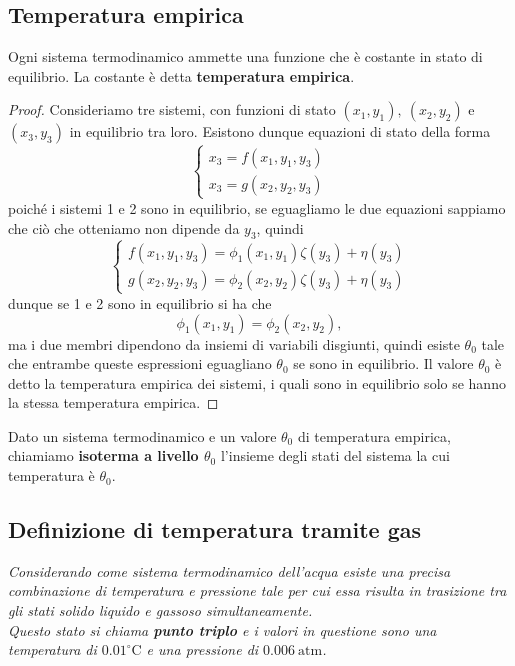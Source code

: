 \subsection{Temperatura empirica}

\begin{proposition}\label{TemperaturaEmpirica}
Ogni sistema termodinamico ammette una funzione che \`e costante in stato di equilibrio. La costante \`e detta \textbf{temperatura empirica}.
\end{proposition}
\begin{proof}
Consideriamo tre sistemi, con funzioni di stato $(x_1, y_1),\ (x_2,y_2)$ e $(x_3,y_3)$ in equilibrio tra loro. Esistono dunque equazioni di stato della forma
\[\begin{cases}
x_3=f(x_1,y_1,y_3)\\
x_3=g(x_2,y_2,y_3)
\end{cases}\]
poich\'e i sistemi 1 e 2 sono in equilibrio, se eguagliamo le due equazioni sappiamo che ci\`o che otteniamo non dipende da $y_3$, quindi
\[\begin{cases}
f(x_1,y_1,y_3)=\phi_1(x_1,y_1)\zeta(y_3)+\eta(y_3)\\
g(x_2,y_2,y_3)=\phi_2(x_2,y_2)\zeta(y_3)+\eta(y_3)
\end{cases}\]
dunque se 1 e 2 sono in equilibrio si ha che 
\[\phi_1(x_1,y_1)=\phi_2(x_2,y_2),\]
ma i due membri dipendono da insiemi di variabili disgiunti, quindi esiste $\theta_0$ tale che entrambe queste espressioni eguagliano $\theta_0$ se sono in equilibrio. Il valore $\theta_0$ \`e detto la temperatura empirica dei sistemi, i quali sono in equilibrio solo se hanno la stessa temperatura empirica.
\end{proof}

\begin{definition}[Isoterme]
Dato un sistema termodinamico e un valore $\theta_0$ di temperatura empirica, chiamiamo \textbf{isoterma a livello $\theta_0$} l'insieme degli stati del sistema la cui temperatura \`e $\theta_0$.
\end{definition}


\subsection{Definizione di temperatura tramite gas}
\begin{fact}
\emph{Considerando come sistema termodinamico dell'acqua esiste una precisa combinazione di temperatura e pressione tale per cui essa risulta in trasizione tra gli stati solido liquido e gassoso simultaneamente.\\
Questo stato si chiama \textbf{punto triplo} e i valori in questione sono una temperatura di $0.01 ^\circ \mathrm{C}$ e una pressione di $0.006\ \mathrm{atm}$.}
\end{fact}
\medskip

